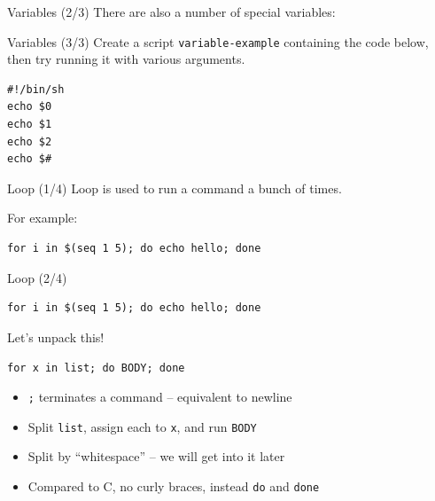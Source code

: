 \documentclass[12pt]{beamer}
\begin{document}
\begin{frame}[fragile]{Variables (2/3)}
  There are also a number of special variables:
\end{frame}

\begin{frame}[fragile]{Variables (3/3)}
  Create a script \texttt{variable-example} containing the code below, then try running it with various arguments.
  \begin{verbatim}
#!/bin/sh
echo $0
echo $1
echo $2
echo $#
\end{verbatim}

\end{frame}

\begin{frame}[fragile]{Loop (1/4)}
  Loop is used to run a command a bunch of times.

  For example:
  \begin{verbatim}
for i in $(seq 1 5); do echo hello; done
\end{verbatim}
\end{frame}

\begin{frame}[fragile]{Loop (2/4)}
  \begin{verbatim}
for i in $(seq 1 5); do echo hello; done
\end{verbatim}
  Let's unpack this!

  \texttt{for x in list; do BODY; done}
  \begin{itemize}
    \item \texttt{;} terminates a command -- equivalent to newline
    \item Split \texttt{list}, assign each to \texttt{x}, and run \texttt{BODY}
    \item Split by ``whitespace'' -- we will get into it later
    \item Compared to C, no curly braces, instead \texttt{do} and \texttt{done}
  \end{itemize}
\end{frame}
\end{document}
